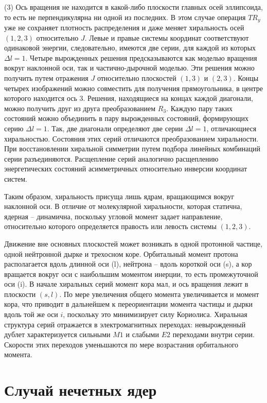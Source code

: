 \documentclass[a4paper, 10pt, twocolumn]{article}
\begin{document}
(3) Ось вращения не находится в какой-либо плоскости главных осей 
эллипсоида, то есть не перпендикулярна ни одной из последних. В этом 
случае операция $TR_y$ уже не сохраняет плотность распределения и даже 
меняет хиральность осей $(1,2,3)$ относительно $J$. Левые и правые 
системы координат соответствуют одинаковой энергии, следовательно, 
имеются две серии, для каждой из которых $\Delta l = 1$. Четыре 
вырожденных решения предсказываются как моделью вращения вокруг 
наклонной оси, так и частично-дырочной моделью. Эти решения можно 
получить путем отражения $J$ относительно плоскостей $(1,3)$ и $(2,3)$. 
Концы четырех изображений можно совместить для получения прямоугольника, 
в центре которого находится ось 3. Решения, находящиеся на концах каждой 
диагонали, можно получить друг из друга преобразованием $R_3$. Каждую 
пару таких состояний можно объединить в пару вырожденных состояний, 
формирующих серию $\Delta l = 1$. Так, две диагонали определяют две 
серии $\Delta l = 1$, отличающиеся хиральностью. Состояния этих серий 
отличаются преобразованием хиральности. При восстановлении хиральной 
симметрии путем подбора линейных комбинаций серии разъединяются. 
Расщепление серий аналогично расщеплению энергетических состояний 
асимметричных относительно инверсии координат систем.

Таким образом, хиральность присуща лишь ядрам, вращающимся вокруг 
наклонной оси. В отличие от молекулярной хиральности, которая статична, 
ядерная -- динамична, поскольку угловой момент задает направление, 
относительно которого определяется правость или левость системы 
$(1,2,3)$.

Движение вне основных плоскостей может возникать в одной протонной 
частице, одной нейтронной дырке и трехосном коре. Орбитальный момент 
протона располагается вдоль длинной оси (l), нейтрона -- вдоль короткой 
оси (s), а кор вращается вокруг оси с наибольшим моментом инерции, то 
есть промежуточной оси (i). В начале хиральных серий момент кора мал, 
и ось вращения лежит в плоскости $(s,l)$. По мере увеличения общего 
момента увеличивается и момент кора, что приводит в дальнейшем 
к переориентации момента частицы и дырки вдоль той же оси $i$, поскольку 
это минимизирует силу Кориолиса. Хиральная структура серий отражается 
в электромагнитных переходах: невырожденный дублет характеризуется 
сильными $M1$ и слабыми $E2$ переходами внутри серии. Скорости этих 
переходов уменьшаются по мере возрастания орбитального момента.


\section{Случай нечетных ядер}%
\end{document}
